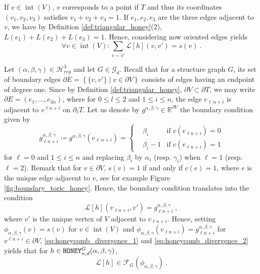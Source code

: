 \documentclass[11pt,a4paper]{amsart}
\providecommand{\honey}{\texttt{\textsc{HONEY}}}
\DeclareMathOperator{\interior}{int}
\numberwithin{equation}{section}
\theoremstyle{definition}
\begin{document}
\noindent
If $v\in \interior(V)$, $v$ corresponds to a point if $T$ and thus 
its coordinates $(v_1,v_2,v_3)$ satisfies $v_1+v_2+v_3=1$. 
If $e_1,e_2,e_3$ are the three edges adjacent to $v$, we have by 
Definition \ref{def:triangular_honey}(2), $L(e_1)+L(e_2)+L(e_3)=1$.
Hence, considering now oriented edges yields 
\begin{equation}
    \label{eq:honeycomb_divergence_1}
    \forall v \in \interior(V): \sum_{v\sim v'}\mathcal{L}[h](v,v')=s(v) \ .
\end{equation}

\noindent
Let $(\alpha, \beta, \gamma) \in \mathcal{H}_{reg}^3$ and let $G\in\mathcal{G}_d$. 
Recall that for a structure graph $G$, its set of boundary edges
$\partial E = \left\{ \{v, v'\} \mid v \in \partial V \right\}$ consists of edges having an endpoint of degree one. Since by Definition \ref{def:triangular_honey}, 
$\partial V \subset \partial T$, 
we may write $\partial E = \left( e_1, \dots, e_{3n} \right)$, where for 
$0 \leqslant l \leqslant 2$
and $1 \leqslant i \leqslant n$, the edge
$e_{\ell \, n + i}$ is adjacent to $v^{\ell n+ i}$ on $\partial_\ell T$.
Let us denote by 
$g^{\alpha,\beta,\gamma} \in \mathbb{R}^{\partial V}$ the boundary condition
given by 
$$ g^{\alpha,\beta,\gamma}_{\ell n+i} \coloneqq g^{\alpha,\beta,\gamma}(e_{\ell \, n + i}) 
= 
\left\lbrace 
\begin{aligned} 
    &\beta_i&\text{if }c(e_{\ell n+i})=0 \\ 
    &\beta_i-1&\text{if }c(e_{\ell n+i})=1
\end{aligned} \right . $$
for $\ell = 0$ and $1\leqslant i\leqslant n$ and replacing 
$\beta_i$ by $\alpha_i$ (resp. $\gamma_i$) 
when $\ell = 1$ (resp. $\ell = 2$). Remark that for $v\in \partial V$, $s(v)=1$ 
if and only if $c(e)=1$, where $e$ is the unique edge adjacent to $v$, 
see for example Figure \ref{fig:boundary_toric_honey}. 
Hence, the boundary condition translates into the condition 
\begin{equation}
    \label{eq:honeycomb_divergence_2}\mathcal{L}[h](v_{\ell n+i},v') 
    = g^{\alpha,\beta,\gamma}_{\ell n+i} \ ,
\end{equation}
where $v'$ is the unique vertex of $V$ adjacent to $v_{\ell n+i}$. 
Hence, setting $\phi_{\alpha,\beta,\gamma}(v)=s(v)$ for $v\in \interior(V)$ 
and $\phi_{\alpha,\beta,\gamma}(v_{\ell n+i})=g^{\alpha,\beta,\gamma}_{\ell n+i}$ 
for $v^{\ell n+i}\in \partial V$, \eqref{eq:honeycomb_divergence_1} 
and \eqref{eq:honeycomb_divergence_2} yields that for $h\in \honey_{n,d}^G(\alpha,\beta,\gamma)$,
$$\mathcal{L}[h] \in \mathcal{F}_{G}(\phi_{\alpha,\beta,\gamma}) \ .$$
\end{document}
